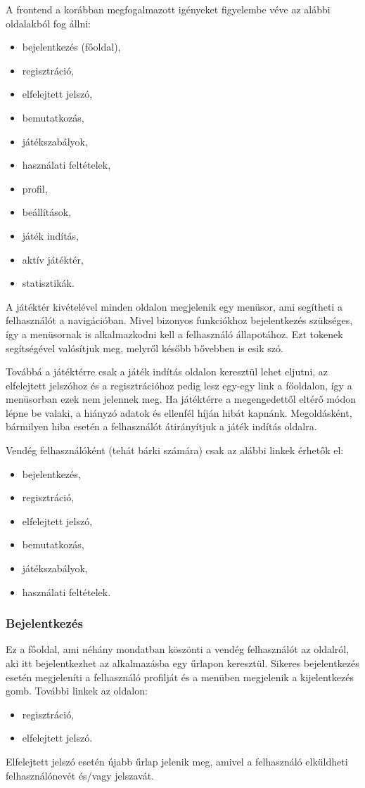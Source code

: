A frontend a korábban megfogalmazott igényeket figyelembe véve az alábbi oldalakból fog állni:
\begin{itemize}
	\item bejelentkezés (főoldal),
	\item regisztráció,
	\item elfelejtett jelszó,
	\item bemutatkozás,
	\item játékszabályok,
	\item használati feltételek,
	\item profil,
	\item beállítások,
	\item játék indítás,
	\item aktív játéktér,
	\item statisztikák.
\end{itemize}
A játéktér kivételével minden oldalon megjelenik egy menüsor, ami segítheti a felhasználót a navigációban. Mivel bizonyos funkciókhoz bejelentkezés szükséges, így a menüsornak is alkalmazkodni kell a felhasználó állapotához. Ezt tokenek segítségével valósítjuk meg, melyről később bővebben is esik szó.

Továbbá a játéktérre csak a játék indítás oldalon keresztül lehet eljutni, az elfelejtett jelszóhoz és a regisztrációhoz pedig lesz egy-egy link a főoldalon, így a menüsorban ezek nem jelennek meg. Ha játéktérre a megengedettől eltérő módon lépne be valaki, a hiányzó adatok és ellenfél híján hibát kapnánk. Megoldásként, bármilyen hiba esetén a felhasználót átirányítjuk a játék indítás oldalra.

Vendég felhasználóként (tehát bárki számára) csak az alábbi linkek érhetők el:
\begin{itemize}
	\item bejelentkezés,
	\item regisztráció,
	\item elfelejtett jelszó,
	\item bemutatkozás,
	\item játékszabályok,
	\item használati feltételek.
\end{itemize}

\subsubsection{Bejelentkezés}
Ez a főoldal, ami néhány mondatban köszönti a vendég felhasználót az oldalról, aki itt bejelentkezhet az alkalmazásba egy űrlapon keresztül.
Sikeres bejelentkezés esetén megjeleníti a felhasználó profilját és a menüben megjelenik a kijelentkezés gomb.
További linkek az oldalon:
\begin{itemize}
	\item regisztráció,
	\item elfelejtett jelszó.
\end{itemize}
Elfelejtett jelszó esetén újabb űrlap jelenik meg, amivel a felhasználó elküldheti felhasználónevét és/vagy jelszavát.


